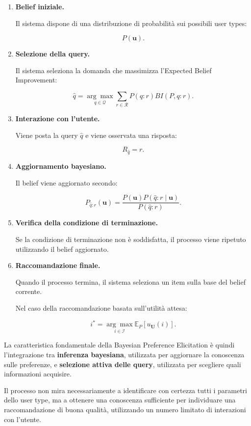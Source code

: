 \begin{enumerate}
    \item \textbf{Belief iniziale.}

    Il sistema dispone di una distribuzione di probabilità sui possibili user types:

    \[
    P(\mathbf{u}).
    \]

    \item \textbf{Selezione della query.}

    Il sistema seleziona la domanda che massimizza l'Expected Belief Improvement:

    \[
    \hat q
    =
    \underset{q\in\mathcal{Q}}{\arg\max}
    \sum_{r\in\mathcal{R}}
    P(q:r)BI(P,q:r).
    \]

    \item \textbf{Interazione con l'utente.}

    Viene posta la query $\hat q$ e viene osservata una risposta:

    \[
    R_{\hat q}=r.
    \]

    \item \textbf{Aggiornamento bayesiano.}

    Il belief viene aggiornato secondo:

    \[
    P_{\hat q:r}(\mathbf{u})
    =
    \frac{
    P(\mathbf{u})
    P(\hat q:r\mid\mathbf{u})
    }{
    P(\hat q:r)
    }.
    \]

    \item \textbf{Verifica della condizione di terminazione.}

    Se la condizione di terminazione non è soddisfatta, il processo viene ripetuto utilizzando il belief aggiornato.

    \item \textbf{Raccomandazione finale.}

    Quando il processo termina, il sistema seleziona un item sulla base del belief corrente.

    Nel caso della raccomandazione basata sull'utilità attesa:

    \[
    i^*
    =
    \underset{i\in\mathcal{I}}{\arg\max}
    \mathbb{E}_P[u_{\mathbf{U}}(i)].
    \]
\end{enumerate}

La caratteristica fondamentale della Bayesian Preference Elicitation è quindi l'integrazione tra \textbf{inferenza bayesiana}, utilizzata per aggiornare la conoscenza sulle preferenze, e \textbf{selezione attiva delle query}, utilizzata per scegliere quali informazioni acquisire.

Il processo non mira necessariamente a identificare con certezza tutti i parametri dello user type, ma a ottenere una conoscenza sufficiente per individuare una raccomandazione di buona qualità, utilizzando un numero limitato di interazioni con l'utente.
